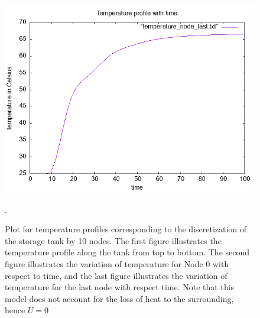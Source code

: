 \documentclass{article}
\begin{document}
\begin{figure}[ht]
\includegraphics[scale =0.5]{figures/temperature_node_last_u_0.png}
\caption{Plot for temperature profiles corresponding to the discretization of the storage tank by 10 nodes. The first figure illustrates the temperature profile along the tank from top to bottom. The second figure illustrates the variation of temperature for Node 0 with respect to time, and the last figure illustrates the variation of temperature for the last node with respect time. Note that this model does not account for the loss of heat to the surrounding, hence $U =  0$}.
\end{figure}
\end{document}
